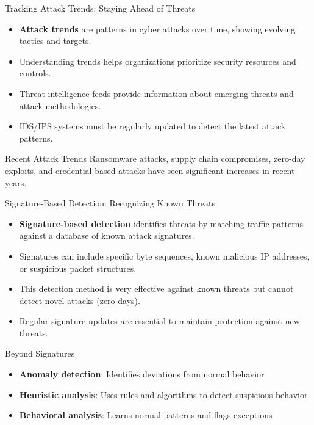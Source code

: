 \documentclass{beamer}
\begin{document}
\begin{frame}{Tracking Attack Trends: Staying Ahead of Threats}
\begin{itemize}
\item \textbf{Attack trends} are patterns in cyber attacks over time, showing evolving tactics and targets.
\item Understanding trends helps organizations prioritize security resources and controls.
\item Threat intelligence feeds provide information about emerging threats and attack methodologies.
\item IDS/IPS systems must be regularly updated to detect the latest attack patterns.
\end{itemize}

\begin{alertblock}{Recent Attack Trends}
Ransomware attacks, supply chain compromises, zero-day exploits, and credential-based attacks have seen significant increases in recent years.
\end{alertblock}
\end{frame}

\begin{frame}{Signature-Based Detection: Recognizing Known Threats}
\begin{itemize}
\item \textbf{Signature-based detection} identifies threats by matching traffic patterns against a database of known attack signatures.
\item Signatures can include specific byte sequences, known malicious IP addresses, or suspicious packet structures.
\item This detection method is very effective against known threats but cannot detect novel attacks (zero-days).
\item Regular signature updates are essential to maintain protection against new threats.
\end{itemize}

\begin{block}{Beyond Signatures}
\begin{itemize}
\item \textbf{Anomaly detection}: Identifies deviations from normal behavior
\item \textbf{Heuristic analysis}: Uses rules and algorithms to detect suspicious behavior
\item \textbf{Behavioral analysis}: Learns normal patterns and flags exceptions
\end{itemize}
\end{block}
\end{frame}
\end{document}
